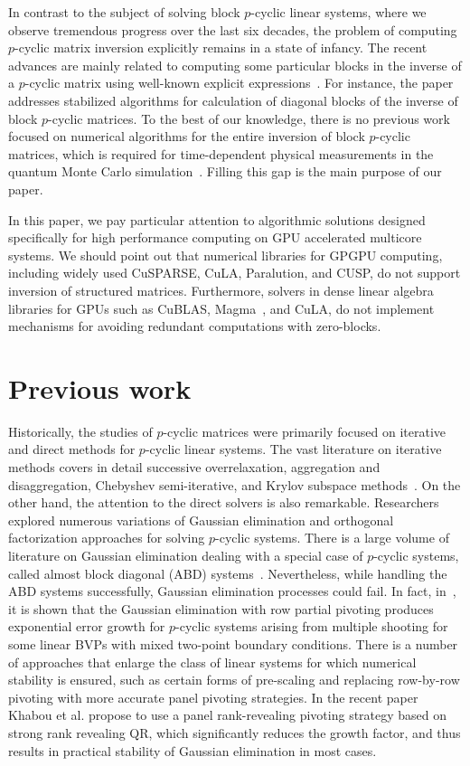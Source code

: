 \documentclass{llncs}
\newcommand{\Blas}{{\sc BLAS}\xspace}
\newcommand{\CuBlas}{{\sc Cu\Blas}\xspace}
\newcommand{\CuSparse}{{\sc CuSPARSE}\xspace}
\newcommand{\Magma}{{\sc Magma}\xspace}
\newcommand{\Cula}{{\sc CuLA}\xspace}
\newcommand{\Paralution}{{\sc Paralution}\xspace}
\newcommand{\Cusp}{{\sc CUSP}\xspace}
\begin{document}
In contrast to the subject of solving block $p$-cyclic linear systems, 
where we observe tremendous progress over the last six decades,
the problem of computing $p$-cyclic matrix inversion explicitly remains in 
a state of infancy. The recent advances are mainly related to 
computing some particular blocks in the inverse of a $p$-cyclic matrix
using well-known explicit expressions~\cite{Bai09}.
For instance, the paper~\cite{Tomas12} addresses stabilized algorithms for 
calculation of diagonal blocks of the inverse of block $p$-cyclic matrices. 
To the best of our knowledge, there is no previous work 
focused on numerical algorithms for the entire inversion of 
block $p$-cyclic matrices, which is required for 
time-dependent physical measurements 
in the quantum Monte Carlo simulation~\cite{Bai09}.
Filling this gap is the main purpose of our paper. 

In this paper, we pay particular attention to 
algorithmic solutions designed specifically for high performance computing 
on GPU accelerated multicore systems.
We should point out that numerical libraries for GPGPU computing,
including widely used 
\CuSparse, \Cula, \Paralution, and \Cusp, 
do not support inversion of structured matrices.
Furthermore, solvers in dense linear algebra libraries for GPUs 
such as \CuBlas,
\Magma~\cite{Tomov10Magma}, and \Cula,
do not implement mechanisms for avoiding redundant 
computations with zero-blocks.

\section{Previous work} 
\label{sec:background}

Historically, the studies of $p$-cyclic matrices
were primarily focused on iterative and direct methods for 
$p$-cyclic linear systems. The vast literature on iterative methods 
covers in detail successive overrelaxation,
aggregation and disaggregation,
Chebyshev semi-iterative, 
and Krylov subspace methods~\cite{Ernst00}.
On the other hand, the attention to the direct solvers 
is also remarkable.
Researchers explored numerous variations of Gaussian elimination and 
orthogonal factorization approaches for solving $p$-cyclic systems.
There is a large volume of literature on Gaussian elimination
dealing with a special case of $p$-cyclic systems, 
called almost block diagonal (ABD) systems~\cite{Wright92BSOF}.
Nevertheless, 
while handling the ABD systems successfully, 
Gaussian elimination processes could fail.
In fact, in~\cite{Wright93}, it is shown that 
the Gaussian elimination with row partial pivoting
produces exponential error growth
for $p$-cyclic systems arising from multiple shooting for 
some linear BVPs with mixed two-point boundary conditions. 
There is a number of approaches that enlarge the class of linear systems
for which numerical stability is ensured, 
such as certain forms of pre-scaling
and replacing row-by-row pivoting with 
more accurate panel pivoting strategies.
In the recent paper~\cite{KhabouDGG13} Khabou et al.
propose to use a panel rank-revealing pivoting strategy 
based on strong rank revealing QR, 
which significantly reduces the growth factor, and 
thus results in practical stability of Gaussian elimination
in most cases.
\end{document}
